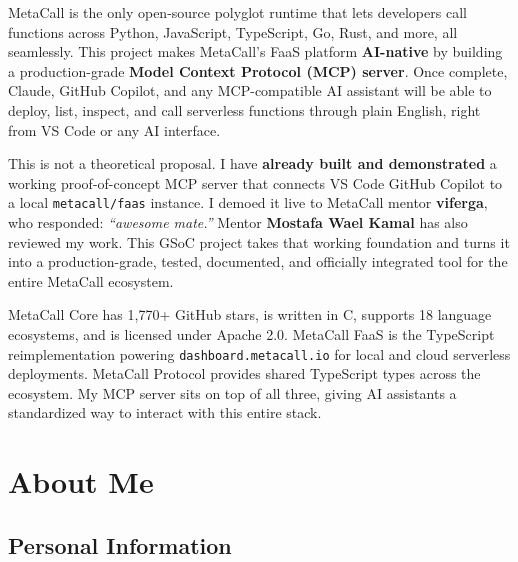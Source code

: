 \documentclass[12pt, a4paper]{article}
\begin{document}
\begin{highlightbox}
MetaCall is the only open-source polyglot runtime that lets developers
call functions across Python, JavaScript, TypeScript, Go, Rust, and more,
all seamlessly. This project makes MetaCall's FaaS platform
\textbf{AI-native} by building a production-grade \textbf{Model Context
Protocol (MCP) server}. Once complete, Claude, GitHub Copilot, and any
MCP-compatible AI assistant will be able to deploy, list, inspect, and
call serverless functions through plain English, right from VS Code or
any AI interface.
\end{highlightbox}

\vspace{0.6em}

This is not a theoretical proposal. I have \textbf{already built and
demonstrated} a working proof-of-concept MCP server that connects VS Code
GitHub Copilot to a local \texttt{metacall/faas} instance. I demoed it
live to MetaCall mentor \textbf{viferga}, who responded:
\emph{``awesome mate.''} Mentor \textbf{Mostafa Wael Kamal} has also
reviewed my work. This GSoC project takes that working foundation and
turns it into a production-grade, tested, documented, and officially
integrated tool for the entire MetaCall ecosystem.

MetaCall Core has 1,770+ GitHub stars, is written in C, supports
18 language ecosystems, and is licensed under Apache 2.0. MetaCall FaaS
is the TypeScript reimplementation powering
\texttt{dashboard.metacall.io} for local and cloud serverless
deployments. MetaCall Protocol provides shared TypeScript types across
the ecosystem. My MCP server sits on top of all three, giving AI
assistants a standardized way to interact with this entire stack.

\newpage
\section{About Me}

\subsection{Personal Information}
\end{document}

